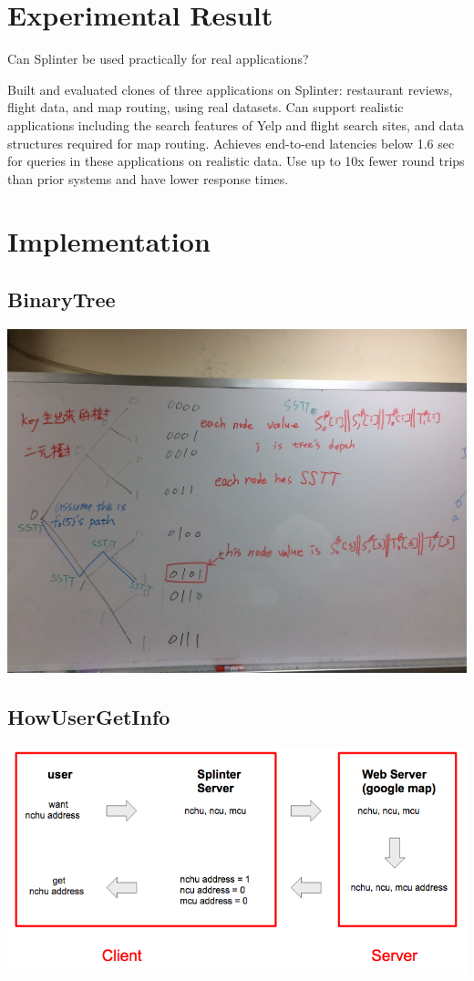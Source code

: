 \documentclass[12pt,a4paper]{article}
\begin{document}
\begin{multicols}{2}
\section{Experimental Result}
Can Splinter be used practically for real applications?  

Built and evaluated clones of three applications on Splinter: restaurant reviews, flight data, and map routing, using real datasets.
Can support realistic applications including the search features of Yelp and flight search sites, and data structures required for map routing.
Achieves end-to-end latencies below 1.6 sec for queries in these applications on realistic data.
Use up to 10x fewer round trips than prior systems and have lower response times. 
 
\section{Implementation} 
\subsection{BinaryTree}
\includegraphics[scale=0.15]{BinaryTree.jpg}
\subsection{HowUserGetInfo}
\includegraphics[scale=0.27]{HowUserGetInfo.png}

\end{multicols}
\end{document}
